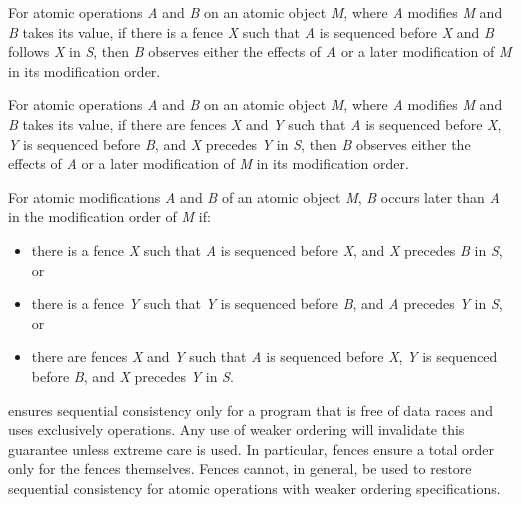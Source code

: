 \pnum
For atomic operations \textit{A} and \textit{B} on an atomic object \textit{M}, where
\textit{A} modifies \textit{M} and \textit{B} takes its value, if there is a
 fence \textit{X} such that \textit{A} is sequenced before
\textit{X} and \textit{B} follows \textit{X} in \textit{S}, then \textit{B} observes
either the effects of \textit{A} or a later modification of \textit{M} in its
modification order.

\pnum
For atomic operations \textit{A} and \textit{B} on an atomic object \textit{M}, where
\textit{A} modifies \textit{M} and \textit{B} takes its value, if there are
 fences \textit{X} and \textit{Y} such that \textit{A} is
sequenced before \textit{X}, \textit{Y} is sequenced before \textit{B}, and \textit{X}
precedes \textit{Y} in \textit{S}, then \textit{B} observes either the effects of
\textit{A} or a later modification of \textit{M} in its modification order.

\pnum
For atomic modifications \textit{A} and \textit{B} of an atomic object \textit{M},
\textit{B} occurs later than \textit{A} in the modification order of \textit{M} if:

\begin{itemize}
\item there is a  fence \textit{X} such that \textit{A}
is sequenced before \textit{X}, and \textit{X} precedes \textit{B} in \textit{S}, or
\item there is a  fence \textit{Y} such that \textit{Y}
is sequenced before \textit{B}, and \textit{A} precedes \textit{Y} in \textit{S}, or
\item there are  fences \textit{X} and \textit{Y} such that \textit{A}
is sequenced before \textit{X}, \textit{Y} is sequenced before \textit{B},
and \textit{X} precedes \textit{Y} in \textit{S}.
\end{itemize}


\pnum
\enternote {} ensures sequential consistency only for a
program that is free of data races and uses exclusively 
operations. Any use of weaker ordering will invalidate this guarantee unless extreme
care is used. In particular,  fences ensure a total order
only for the fences themselves. Fences cannot, in general, be used to restore sequential
consistency for atomic operations with weaker ordering specifications. \exitnote

